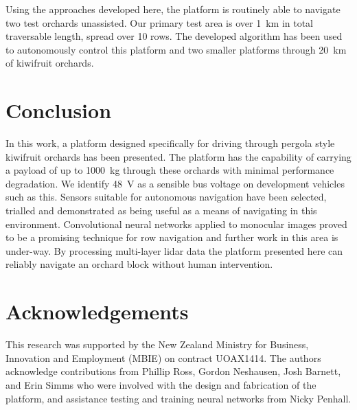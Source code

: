 \documentclass[preprint,authoryear,12pt]{elsarticle}
\begin{document}
    Using the approaches developed here, the platform is routinely able to navigate two test orchards unassisted.
    Our primary test area is over \SI{1}{\kilo\meter} in total traversable length, spread over 10 rows.
    The developed algorithm has been used to autonomously control this platform and two smaller platforms through \SI{20}{\kilo\meter} of kiwifruit orchards.


\section{Conclusion}
    In this work, a platform designed specifically for driving through pergola style kiwifruit orchards has been presented.
    The platform has the capability of carrying a payload of up to \SI{1000}{\kilo\gram} through these orchards with minimal performance degradation.
    We identify \SI{48}{\volt} as a sensible bus voltage on development vehicles such as this.
    Sensors suitable for autonomous navigation have been selected, trialled and demonstrated as being useful as a means of navigating in this environment.
    Convolutional neural networks applied to monocular images proved to be a promising technique for row navigation and further work in this area is under-way.
    By processing multi-layer lidar data the platform presented here can reliably navigate an orchard block without human intervention.


\section*{Acknowledgements}
This research was supported by the New Zealand Ministry for Business, Innovation and Employment (MBIE) on contract UOAX1414.
The authors acknowledge contributions from Phillip Ross, Gordon Neshausen, Josh Barnett, and Erin Simms who were involved with the design and fabrication of the platform, and assistance testing and training neural networks from Nicky Penhall.



\end{document}
